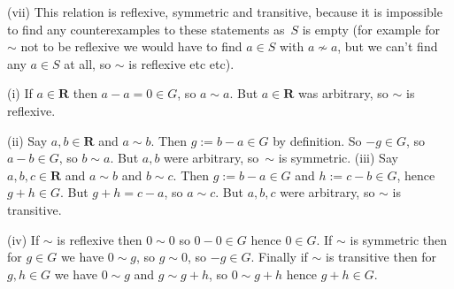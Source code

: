 \documentclass[10pt]{article}
\newcommand{\R}{\mathbf{R}}
\begin{document}
(vii) This relation is reflexive, symmetric and transitive, because it is impossible to find any counterexamples to these statements as~$S$ is empty (for example for $\sim$ not to be reflexive we would have to find $a\in S$ with $a\not\sim a$, but we can't find any $a\in S$ at all, so $\sim$ is reflexive etc etc).

\medskip{} 

(i) If $a\in\R$ then $a-a=0\in G$, so $a\sim a$. But $a\in\R$ was arbitrary, so $\sim$ is reflexive.

(ii) Say $a,b\in\R$ and $a\sim b$. Then $g:=b-a\in G$ by definition. So $-g\in G$, so $a-b\in G$, so $b\sim a$. But $a,b$ were arbitrary, so~$\sim$ is symmetric.
(iii) Say $a,b,c\in\R$ and $a\sim b$ and $b\sim c$. Then $g:=b-a\in G$ and $h:=c-b\in G$, hence $g+h\in G$. But $g+h=c-a$, so $a\sim c$. But $a,b,c$ were arbitrary, so $\sim$ is transitive.

(iv) If $\sim$ is reflexive then $0\sim 0$ so $0-0\in G$ hence $0\in G$. If $\sim$ is symmetric then for $g\in G$ we have $0\sim g$, so $g\sim 0$, so $-g\in G$. Finally if $\sim$ is transitive then for $g,h\in G$ we have $0\sim g$ and $g\sim g+h$, so $0\sim g+h$ hence $g+h\in G$.
\end{document}
